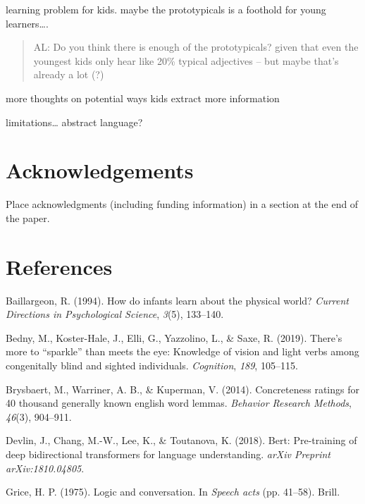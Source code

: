 \documentclass[10pt, letterpaper]{article}
\begin{document}
learning problem for kids. maybe the prototypicals is a foothold for
young learners\ldots{}.

\begin{quote}
AL: Do you think there is enough of the prototypicals? given that even
the youngest kids only hear like 20\% typical adjectives -- but maybe
that's already a lot (?)
\end{quote}

more thoughts on potential ways kids extract more information

limitations\ldots{} abstract language?

\hypertarget{acknowledgements}{%
\section{Acknowledgements}\label{acknowledgements}}

Place acknowledgments (including funding information) in a section at
the end of the paper.

\hypertarget{references}{%
\section{References}\label{references}}

\setlength{\parindent}{-0.1in} 
\setlength{\leftskip}{0.125in}

\noindent

\hypertarget{refs}{}
\leavevmode\hypertarget{ref-baillargeon1994}{}%
Baillargeon, R. (1994). How do infants learn about the physical world?
\emph{Current Directions in Psychological Science}, \emph{3}(5),
133--140.

\leavevmode\hypertarget{ref-bedny2019}{}%
Bedny, M., Koster-Hale, J., Elli, G., Yazzolino, L., \& Saxe, R. (2019).
There's more to ``sparkle'' than meets the eye: Knowledge of vision and
light verbs among congenitally blind and sighted individuals.
\emph{Cognition}, \emph{189}, 105--115.

\leavevmode\hypertarget{ref-brysbaert2014}{}%
Brysbaert, M., Warriner, A. B., \& Kuperman, V. (2014). Concreteness
ratings for 40 thousand generally known english word lemmas.
\emph{Behavior Research Methods}, \emph{46}(3), 904--911.

\leavevmode\hypertarget{ref-devlin2018}{}%
Devlin, J., Chang, M.-W., Lee, K., \& Toutanova, K. (2018). Bert:
Pre-training of deep bidirectional transformers for language
understanding. \emph{arXiv Preprint arXiv:1810.04805}.

\leavevmode\hypertarget{ref-grice1975}{}%
Grice, H. P. (1975). Logic and conversation. In \emph{Speech acts} (pp.
41--58). Brill.
\end{document}
